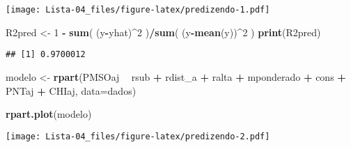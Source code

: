 \documentclass[
]{article}
\newenvironment{Shaded}{\begin{snugshade}}{\end{snugshade}}
\newcommand{\DataTypeTok}[1]{\textcolor[rgb]{0.13,0.29,0.53}{#1}}
\newcommand{\DecValTok}[1]{\textcolor[rgb]{0.00,0.00,0.81}{#1}}
\newcommand{\KeywordTok}[1]{\textcolor[rgb]{0.13,0.29,0.53}{\textbf{#1}}}
\newcommand{\NormalTok}[1]{#1}
\newcommand{\OperatorTok}[1]{\textcolor[rgb]{0.81,0.36,0.00}{\textbf{#1}}}
\newcommand{\StringTok}[1]{\textcolor[rgb]{0.31,0.60,0.02}{#1}}
\begin{document}
\texttt{[image: Lista-04\_files/figure-latex/predizendo-1.pdf]}

\begin{Shaded}
\begin{Highlighting}[]
\NormalTok{R2pred <-}\StringTok{ }\DecValTok{1} \OperatorTok{-}\StringTok{ }\KeywordTok{sum}\NormalTok{( (y}\OperatorTok{-}\NormalTok{yhat)}\OperatorTok{^}\DecValTok{2}\NormalTok{ )}\OperatorTok{/}\KeywordTok{sum}\NormalTok{( (y}\OperatorTok{-}\KeywordTok{mean}\NormalTok{(y))}\OperatorTok{^}\DecValTok{2}\NormalTok{ )}
\KeywordTok{print}\NormalTok{(R2pred)}
\end{Highlighting}
\end{Shaded}

\begin{verbatim}
## [1] 0.9700012
\end{verbatim}

\begin{Shaded}
\begin{Highlighting}[]
\NormalTok{modelo <-}\StringTok{ }\KeywordTok{rpart}\NormalTok{(PMSOaj }\OperatorTok{~}\StringTok{  }\NormalTok{rsub }\OperatorTok{+}\StringTok{ }\NormalTok{rdist_a }\OperatorTok{+}\StringTok{ }\NormalTok{ralta }\OperatorTok{+}\StringTok{ }\NormalTok{mponderado }\OperatorTok{+}\StringTok{ }\NormalTok{cons }\OperatorTok{+}\StringTok{ }\NormalTok{PNTaj }\OperatorTok{+}\StringTok{ }\NormalTok{CHIaj,  }\DataTypeTok{data=}\NormalTok{dados)}
 
\KeywordTok{rpart.plot}\NormalTok{(modelo)}
\end{Highlighting}
\end{Shaded}

\texttt{[image: Lista-04\_files/figure-latex/predizendo-2.pdf]}
\end{document}
